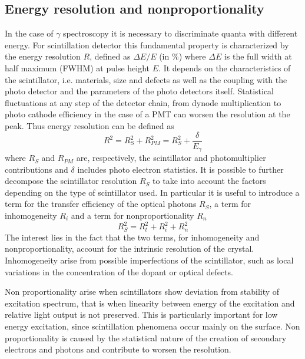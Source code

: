 \subsection{Energy resolution and nonproportionality}
In the case of $\gamma$ spectroscopy it is necessary to discriminate quanta with different energy.
For scintillation detector this fundamental property is characterized by the energy resolution $R$, defined as $\Delta E/E$ (in $\%$) where $\Delta E$ is the full width at half maximum (FWHM) at pulse height $E$.
It depends on the characteristics of the scintillator, i.e. materials, size and defects as well as the coupling with the photo detector and the parameters of the photo detectors itself. Statistical fluctuations at any step of the detector chain, from dynode multiplication to photo cathode efficiency in the case of a PMT can worsen the resolution at the peak. 
Thus energy resolution can be defined as \cite{Rodnyi1997}
\begin{equation}
R^{2} = R_{S}^{2} + R_{PM}^{2} = R_{S}^{2} + \frac{\delta}{E_{\gamma}}
\end{equation}
where $R_{S}$ and $R_{PM}$ are, respectively, the scintillator and photomultiplier contributions and $\delta$ includes photo electron statistics.
It is possible to further decompose the scintillator resolution $R_{S}$ to take into account the factors depending on the type of scintillator used. In particular it is useful to introduce a term for the transfer efficiency of the optical photons $R_{S}$, a term for inhomogeneity $R_{i}$ and a term for nonproportionality $R_{n}$
\begin{equation}
R_{S}^{2} = R_{t}^{2} + R_{i}^{2} + R_{n}^{2}
\end{equation}
The interest lies in the fact that the two terms, for inhomogeneity and nonproportionality, account for the intrinsic resolution of the crystal.
Inhomogeneity arise from possible imperfections of the scintillator, such as local variations in the concentration of the dopant or optical defects.

Non proportionality arise when scintillators show deviation from stability of excitation spectrum, that is when linearity between energy of the excitation and relative light output is not preserved. This is particularly important for low energy excitation, since scintillation phenomena occur mainly on the surface. Non proportionality is caused by the statistical nature of the creation of secondary electrons and photons and contribute to worsen the resolution.


